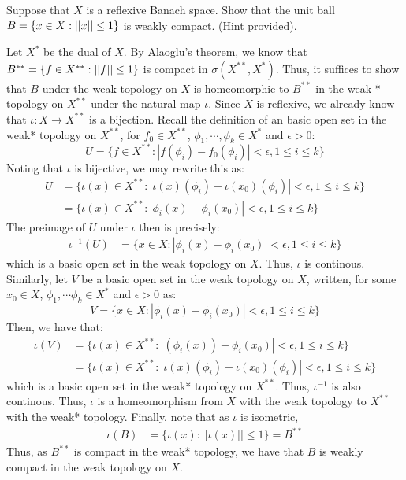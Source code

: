 \documentclass[12pt]{article}
\begin{document}


\begin{problem}{54}
    Suppose that $X$ is a reflexive Banach space. Show that the unit ball $B = \{x \in X: \left\vert\left\vert x\right\vert\right\vert \leq 1\}$ is weakly compact. (Hint provided). 
\end{problem}
\begin{solution}
    Let $X^*$ be the dual of $X$. By Alaoglu's theorem, we know that $B^{**} = \{f \in X^{**}: \left\vert\left\vert f\right\vert\right\vert \leq 1\}$ is compact in $\sigma(X^{**}, X^*)$. Thus, it suffices to show that $B$ under the weak topology on $X$ is homeomorphic to $B^{**}$ in the weak-* topology on $X^{**}$ under the natural map $\iota$. \bbni
    Since $X$ is reflexive, we already know that $\iota: X \to X^{**}$ is a bijection. Recall the definition of an basic open set in the weak* topology on $X^{**}$, for $f_0 \in X^{**}$, $\phi_1, \cdots, \phi_k \in X^*$ and $\epsilon > 0$:
    \[ U = \{f \in X^{**}: |f(\phi_i)-f_0(\phi_i)| < \epsilon, 1 \leq i\leq k\}\]
    Noting that $\iota$ is bijective, we may rewrite this as:
    \begin{align*}
       U &= \{\iota(x) \in X^{**}: |\iota(x)(\phi_i)-\iota(x_0)(\phi_i)| < \epsilon, 1 \leq i\leq k\}  \\
         &= \{\iota(x) \in X^{**}: |\phi_i(x)-\phi_i(x_0)| < \epsilon, 1 \leq i\leq k\}
    \end{align*}
    The preimage of $U$ under $\iota$ then is precisely:
    \begin{align*}
        \iota^{-1}(U) &= \{x \in X: |\phi_i(x)-\phi_i(x_0)| < \epsilon, 1 \leq i\leq k\}    
    \end{align*}
    which is a basic open set in the weak topology on $X$. Thus, $\iota$ is continous. \bbni
    Similarly, let $V$ be a basic open set in the weak topology on $X$, written, for some $x_0 \in X$, $\phi_1, \cdots \phi_k \in X^*$ and $\epsilon > 0$ as:
    \[ V = \{x \in X: |\phi_i(x)-\phi_i(x_0)| < \epsilon, 1 \leq i\leq k\}\]
    Then, we have that:
    \begin{align*}
        \iota(V) &= \{\iota(x) \in X^{**}: |(\phi_i(x))-\phi_i(x_0)| < \epsilon, 1 \leq i\leq k\} \\
        &= \{\iota(x) \in X^{**}: |\iota(x)(\phi_i)-\iota(x_0)(\phi_i)| < \epsilon, 1 \leq i\leq k\}
    \end{align*}
    which is a basic open set in the weak* topology on $X^{**}$. Thus, $\iota^{-1}$ is also continous. \bbni
    Thus, $\iota$ is a homeomorphism from $X$ with the weak topology to $X^{**}$ with the weak* topology. Finally, note that as $\iota$ is isometric,
    \begin{align*}
        \iota(B) &= \{\iota(x): ||\iota(x)|| \leq 1 \} = B^{**}
    \end{align*}
    Thus, as $B^{**}$ is compact in the weak* topology, we have that $B$ is weakly compact in the weak topology on $X$.
\end{solution}
\newpage
\end{document}
